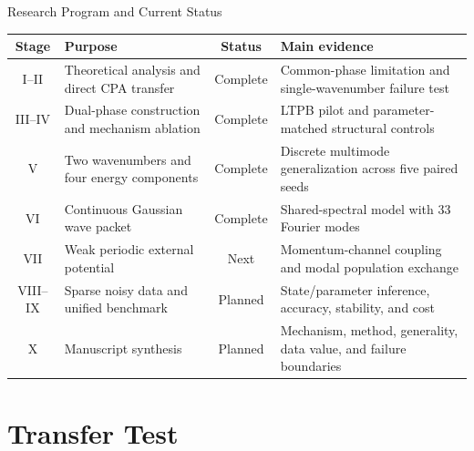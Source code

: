 \documentclass[aspectratio=169,10pt]{beamer}
\begin{document}
\begin{frame}{Research Program and Current Status}
\small
\renewcommand{\arraystretch}{1.16}
\begin{tabularx}{\textwidth}{@{}cYcY@{}}
\toprule
Stage & Purpose & Status & Main evidence \\
\midrule
I--II & Theoretical analysis and direct CPA transfer & Complete &
Common-phase limitation and single-wavenumber failure test \\
III--IV & Dual-phase construction and mechanism ablation & Complete &
LTPB pilot and parameter-matched structural controls \\
V & Two wavenumbers and four energy components & Complete &
Discrete multimode generalization across five paired seeds \\
VI & Continuous Gaussian wave packet & Complete &
Shared-spectral model with 33 Fourier modes \\
VII & Weak periodic external potential & Next &
Momentum-channel coupling and modal population exchange \\
VIII--IX & Sparse noisy data and unified benchmark & Planned &
State/parameter inference, accuracy, stability, and cost \\
X & Manuscript synthesis & Planned &
Mechanism, method, generality, data value, and failure boundaries \\
\bottomrule
\end{tabularx}
\end{frame}

\section{Transfer Test}
\end{document}
